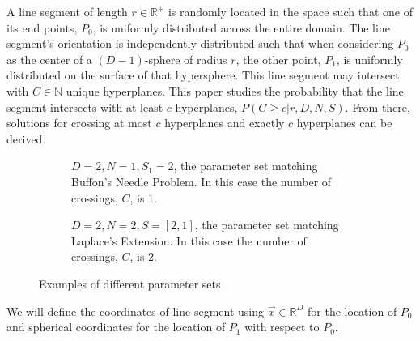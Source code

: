 \documentclass{article}
\begin{document}
A line segment of length $r\in\mathbb{R}^+$ is randomly located in the space such that one of its end points, $P_0$, is uniformly distributed
across the entire domain. The line segment's orientation is independently distributed such that when considering $P_0$ as the center of a $(D-1)$-sphere of radius $r$, the other point, $P_1$,
is uniformly distributed on the surface of that hypersphere. This line segment may intersect with $C\in\mathbb{N}$ unique hyperplanes. This paper studies the probability that the line segment
intersects with at least $c$ hyperplanes, $P(C\ge c|r, D, N, S)$. From there, solutions for crossing at most $c$ hyperplanes and exactly $c$ hyperplanes can
be derived.
\begin{figure}[H]
	\centering
	\begin{subfigure}{0.45\textwidth}
		\centering
		\caption{$D=2, N=1, S_1=2$, the parameter set matching Buffon's Needle Problem. In this case the number of crossings, $C$, is 1.}
		\label{fig:buffon example}
	\end{subfigure}
	\hspace{1cm}
	\begin{subfigure}{0.45\textwidth}
		\centering
		\caption{$D=2, N=2, S=[2,1]$, the parameter set matching Laplace's Extension. In this case the number of crossings, $C$, is 2.}
		\label{fig:laplace example}
	\end{subfigure}
	\caption{Examples of different parameter sets}
\end{figure}

We will define the coordinates of line segment using $\vec{x}\in\mathbb{R}^D$ for the location of $P_0$ and spherical coordinates for the location of $P_1$ with respect to $P_0$.
\end{document}

